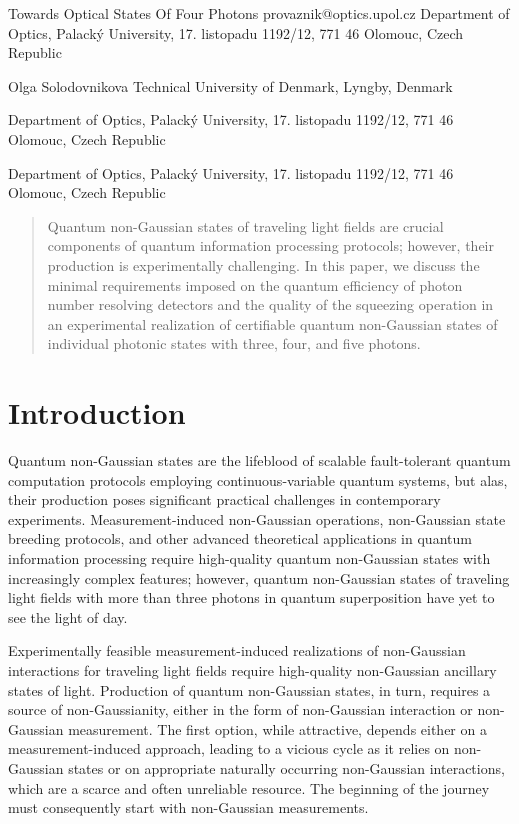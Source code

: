\documentclass{article}
\begin{document}
\ArticleTitle
  {Towards Optical States Of Four Photons}
  {provaznik@optics.upol.cz}
\ArticleAuthorAddress
  {Department of Optics, Palack\'{y} University, 17. listopadu 1192/12, 771 46 Olomouc, Czech Republic}

\ArticleAuthor
  {Olga Solodovnikova}
\ArticleAuthorAddress
  {Technical University of Denmark, Lyngby, Denmark}

\ArticleAuthorAddress
  {Department of Optics, Palack\'{y} University, 17. listopadu 1192/12, 771 46 Olomouc, Czech Republic}

\ArticleAuthorAddress
  {Department of Optics, Palack\'{y} University, 17. listopadu 1192/12, 771 46 Olomouc, Czech Republic}

\ArticleTitlePrint

\begin{abstract}\noindent
  Quantum non-Gaussian states of traveling light fields are crucial components of quantum information processing protocols; however, their production is experimentally challenging. In this paper, we discuss the minimal requirements imposed on the quantum efficiency of photon number resolving detectors and the quality of the squeezing operation in an experimental realization of certifiable quantum non-Gaussian states of individual photonic states with three, four, and five photons.
\end{abstract}

%

\section{Introduction}

Quantum non-Gaussian states are the lifeblood of scalable fault-tolerant quantum computation protocols employing continuous-variable quantum systems, but alas, their production poses significant practical challenges in contemporary experiments. Measurement-induced non-Gaussian operations, non-Gaussian state breeding protocols, and other advanced theoretical applications in quantum information processing require high-quality quantum non-Gaussian states with increasingly complex features; however, quantum non-Gaussian states of traveling light fields with more than three photons in quantum superposition have yet to see the light of day.

Experimentally feasible measurement-induced realizations of non-Gaussian interactions for traveling light fields require high-quality non-Gaussian ancillary states of light. Production of quantum non-Gaussian states, in turn, requires a source of non-Gaussianity, either in the form of non-Gaussian interaction or non-Gaussian measurement. The first option, while attractive, depends either on a measurement-induced approach, leading to a vicious cycle as it relies on non-Gaussian states or on appropriate naturally occurring non-Gaussian interactions, which are a scarce and often unreliable resource. The beginning of the journey must consequently start with non-Gaussian measurements.
\end{document}
